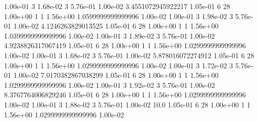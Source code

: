 \documentclass{article}
\theoremstyle{named}
\begin{document}
{1.00e-01 3 1.68e-02 3 5.76e-01 1.00e-02 3.4551072945922217 1.05e-01 6 28 1.00e+00 1 1 1.56e+00 1.0599999999999996 1.00e-02
1.00e-01 3 1.98e-02 3 5.76e-01 1.00e-02 4.1246263829013525 1.05e-01 6 28 1.00e+00 1 1 1.56e+00 1.0399999999999996 1.00e-02
1.00e-01 3 1.89e-02 3 5.76e-01 1.00e-02 4.9238826317067419 1.05e-01 6 28 1.00e+00 1 1 1.56e+00 1.0299999999999996 1.00e-02
1.00e-01 3 1.68e-02 3 5.76e-01 1.00e-02 5.878016072274912 1.05e-01 6 28 1.00e+00 1 1 1.56e+00 1.0299999999999996 1.00e-02
1.00e-01 3 1.72e-02 3 5.76e-01 1.00e-02 7.0170382867038299 1.05e-01 6 28 1.00e+00 1 1 1.56e+00 1.0299999999999996 1.00e-02
1.00e-01 3 1.92e-02 3 5.76e-01 1.00e-02 8.3767764006829246 1.05e-01 6 28 1.00e+00 1 1 1.56e+00 1.0299999999999996 1.00e-02
1.00e-01 3 1.88e-02 3 5.76e-01 1.00e-02 10.0 1.05e-01 6 28 1.00e+00 1 1 1.56e+00 1.0299999999999996 1.00e-02
}\datadoublereduced
\end{document}
